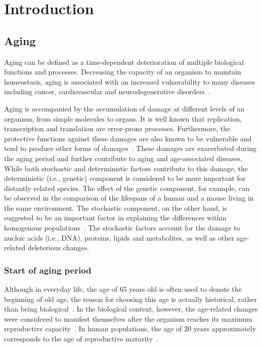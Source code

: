 \chapter{Introduction}
\label{chp:b1}

\section{Aging}
Aging can be defined as a time-dependent deterioration of multiple biological functions and processes.
Decreasing the capacity of an organism to maintain homeostasis, 
aging is associated with an increased vulnerability to many diseases including cancer, cardiovascular and neurodegenerative disorders~\cite{Niccoli2012}.

Aging is accompanied by the accumulation of damage at different levels of an organism, from simple molecules to organs.
It is well known that replication, transcription and translation are error-prone processes.
Furthermore, the protective functions against these damages are also known to be vulnerable and tend to produce other forms of damages~\cite{Gladyshev2016}.
These damages are exacerbated during the aging period and further contribute to aging and age-associated diseases.
While both stochastic and deterministic factors contribute to this damage, 
the deterministic (i.e., genetic) component is considered to be more important for distantly related species.
The effect of the genetic component, for example, can be observed in the comparison of the lifespans of a human and a mouse living in the same environment.
The stochastic component, on the other hand, is suggested to be an important factor in explaining the differences within homogenous populations~\cite{Gladyshev2016}.
The stochastic factors account for the damage to nucleic acids (i.e., DNA), proteins, lipids and metabolites, as well as other age-related deleterious changes.

\subsection{Start of aging period}
Although in everyday life, the age of 65 years old is often used to denote the beginning of old age, 
the reason for choosing this age is actually historical, rather than being biological~\cite{Covey1992}.
In the biological context, however, the age-related changes were considered to manifest themselves after the organism reaches its maximum reproductive capacity~\cite{Vijg2009}.
In human populations, the age of 20 years approximately corresponds to the age of reproductive maturity~\cite{Walker2006}.

